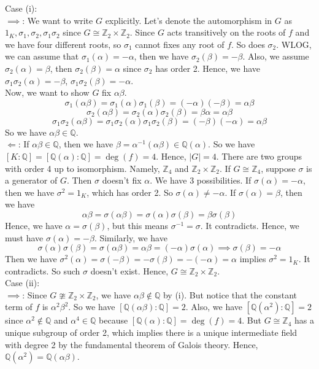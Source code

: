 \documentclass[12pt]{amsart}
\newcommand{\Q}{\mathbb{Q}}
\newcommand{\Z}{\mathbb{Z}}
\begin{document}
Case (i):\\
$\implies$: We want to write $G$ explicitly. Let's denote the automorphism in $G$ as 
$1_K,\sigma_1,\sigma_2,\sigma_1\sigma_2$ since $G\cong \Z_2\times \Z_2$. Since $G$ acts transitively on the roots of $f$ and we have four different roots, so $\sigma_1$ cannot fixes any root of $f$. So does $\sigma_2$. WLOG, we can assume that $\sigma_1(\alpha)=-\alpha$, then we have $\sigma_2(\beta)=-\beta$. Also, we assume $\sigma_2(\alpha)=\beta$, then $\sigma_2(\beta)=\alpha$ since $\sigma_2$ has order 2. Hence, we have $\sigma_1\sigma_2(\alpha)=-\beta$, $\sigma_1\sigma_2(\beta)=-\alpha$.\\
Now, we want to show $G$ fix $\alpha\beta$. 
\[\sigma_1(\alpha\beta)=\sigma_1(\alpha)\sigma_1(\beta)=(-\alpha)(-\beta)=\alpha\beta\]
\[\sigma_2(\alpha\beta)=\sigma_2(\alpha)\sigma_2(\beta)=\beta\alpha=\alpha\beta\]
\[\sigma_1\sigma_2(\alpha\beta)=\sigma_1\sigma_2(\alpha)\sigma_1\sigma_2(\beta)=(-\beta)(-\alpha)=\alpha\beta\]
So we have $\alpha\beta\in\Q$.\\
$\Longleftarrow$: If $\alpha\beta\in \Q$, then we have $\beta=\alpha^{-1}(\alpha\beta)\in\Q(\alpha)$. So we have $[K:\Q]=[\Q(\alpha):\Q]=\deg(f)=4$. Hence, $|G|=4$. There are two groups with order 4 up to isomorphism. Namely, $\Z_4$ and $\Z_2\times \Z_2$. If $G\cong \Z_4$, suppose $\sigma$ is a generator of $G$. Then $\sigma$ doesn't fix $\alpha$. We have 3 possibilities. If $\sigma(\alpha)=-\alpha$, then we have $\sigma^2=1_K$, which has order 2. So $\sigma(\alpha)\neq -\alpha$. If $\sigma(\alpha)=\beta$, then we have 
\[\alpha\beta=\sigma(\alpha\beta)=\sigma(\alpha)\sigma(\beta)=\beta\sigma(\beta)\]
Hence, we have $\alpha=\sigma(\beta)$, but this means $\sigma^{-1}=\sigma$. It contradicts. Hence, we must have $\sigma(\alpha)=-\beta$. Similarly, we have 
\[\sigma(\alpha)\sigma(\beta)=\sigma(\alpha\beta)=\alpha\beta=(-\alpha)\sigma(\alpha)\implies \sigma(\beta)=-\alpha\]
Then we have $\sigma^2(\alpha)=\sigma(-\beta)=-\sigma(\beta)=-(-\alpha)=\alpha$ implies $\sigma^2=1_K$. It contradicts. So such $\sigma$ doesn't exist. Hence, $G\cong \Z_2\times \Z_2$.\\
Case (ii):\\
$\implies$: Since $G\ncong \Z_2\times \Z_2$, we have $\alpha\beta\notin \Q$ by (i). But notice that the constant term of $f$ is $\alpha^2\beta^2$. So we have $[\Q(\alpha\beta):\Q]=2$. Also, we have $[\Q(\alpha^2):\Q]=2$ since $\alpha^2\notin\Q$ and $\alpha^4\in\Q$ because $[\Q(\alpha):\Q]=\deg(f)=4$. But $G\cong \Z_4$ has a unique subgroup of order 2, which implies there is a unique intermediate field with degree 2 by the fundamental theorem of Galois theory. Hence, $\Q(\alpha^2)=\Q(\alpha\beta)$.\\
\end{document}
